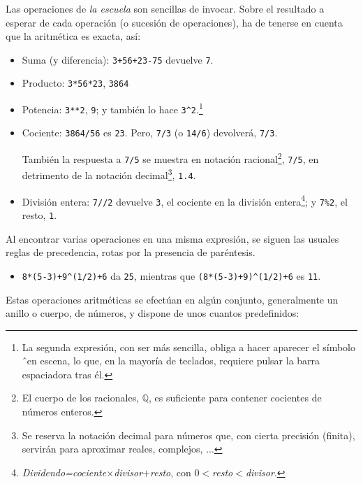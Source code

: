 Las operaciones de \emph{la escuela} son sencillas de invocar. Sobre el
resultado a esperar de cada operación (o sucesión de operaciones), ha de tenerse
en cuenta que la aritmética es exacta, así:
\begin{itemize}
 \item Suma (y diferencia): \lstinline|3+56+23-75| devuelve \lstinline|7|.
 \item Producto: \lstinline|3*56*23|, \lstinline|3864|
 \item Potencia: \lstinline|3**2|, \lstinline|9|; y también lo hace
\lstinline|3^2|.\footnote{La segunda expresión, con ser más sencilla, obliga a
hacer aparecer el símbolo \^\ en escena, lo que, en la mayoría de teclados,
requiere pulsar la barra espaciadora tras él.}
 \item Cociente: \lstinline|3864/56| es \lstinline|23|. Pero, \lstinline|7/3| (o
\lstinline|14/6|) devolverá, \lstinline|7/3|.

También la respuesta a \lstinline|7/5| se muestra en notación
racional\footnote{El cuerpo de los racionales, $\mathbb Q$, es suficiente para
contener cocientes de números enteros.}, \lstinline|7/5|,  en detrimento de la
notación decimal\footnote{Se reserva la notación decimal para números que, con
cierta precisión (finita), servirán para aproximar reales, complejos, ...},
\lstinline|1.4|.

\item División entera: \lstinline|7//2| devuelve \lstinline|3|, el cociente en
la
división entera\footnote{\emph{Dividendo=cociente$\times$divisor$+$resto}, con 
\emph{$0<$resto$<$divisor}.};
y \lstinline|7%2|, el resto, \lstinline|1|. 
\end{itemize}

Al encontrar varias operaciones
en una misma expresión, se siguen las usuales reglas de precedencia, rotas por
la presencia de paréntesis.
\begin{itemize}
 \item \lstinline|8*(5-3)+9^(1/2)+6| da \lstinline|25|, mientras que
\lstinline|(8*(5-3)+9)^(1/2)+6| es \lstinline|11|.
\end{itemize}



Estas operaciones aritm\'eticas se efect\'uan en alg\'un conjunto, generalmente
un anillo o cuerpo, de n\'umeros,  y {\sage} dispone de  unos cuantos
predefinidos:

